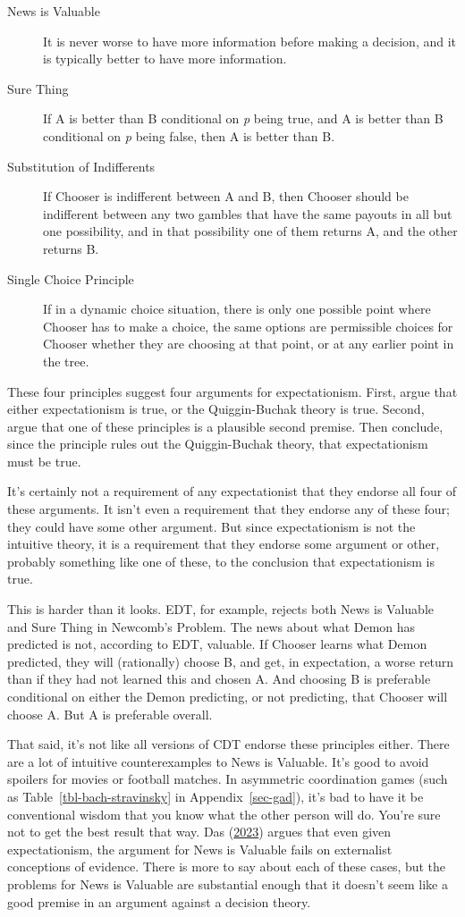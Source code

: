 \documentclass[
  12pt,
  letterpaper,
  DIV=11,
  numbers=noendperiod]{scrreprt}
\begin{document}
\begin{description}
\item[News is Valuable]
It is never worse to have more information before making a decision, and
it is typically better to have more information.
\item[Sure Thing]
If A is better than B conditional on \emph{p} being true, and A is
better than B conditional on \emph{p} being false, then A is better than
B.
\item[Substitution of Indifferents]
If Chooser is indifferent between A and B, then Chooser should be
indifferent between any two gambles that have the same payouts in all
but one possibility, and in that possibility one of them returns A, and
the other returns B.
\item[Single Choice Principle]
If in a dynamic choice situation, there is only one possible point where
Chooser has to make a choice, the same options are permissible choices
for Chooser whether they are choosing at that point, or at any earlier
point in the tree.
\end{description}

These four principles suggest four arguments for expectationism. First,
argue that either expectationism is true, or the Quiggin-Buchak theory
is true. Second, argue that one of these principles is a plausible
second premise. Then conclude, since the principle rules out the
Quiggin-Buchak theory, that expectationism must be true.

It's certainly not a requirement of any expectationist that they endorse
all four of these arguments. It isn't even a requirement that they
endorse any of these four; they could have some other argument. But
since expectationism is not the intuitive theory, it is a requirement
that they endorse some argument or other, probably something like one of
these, to the conclusion that expectationism is true.

This is harder than it looks. EDT, for example, rejects both News is
Valuable and Sure Thing in Newcomb's Problem. The news about what Demon
has predicted is not, according to EDT, valuable. If Chooser learns what
Demon predicted, they will (rationally) choose B, and get, in
expectation, a worse return than if they had not learned this and chosen
A. And choosing B is preferable conditional on either the Demon
predicting, or not predicting, that Chooser will choose A. But A is
preferable overall.

That said, it's not like all versions of CDT endorse these principles
either. There are a lot of intuitive counterexamples to News is
Valuable. It's good to avoid spoilers for movies or football matches. In
asymmetric coordination games (such as Table~\ref{tbl-bach-stravinsky}
in Appendix~\ref{sec-gad}), it's bad to have it be conventional wisdom
that you know what the other person will do. You're sure not to get the
best result that way. Das (\protect\hyperlink{ref-Das2023}{2023}) argues
that even given expectationism, the argument for News is Valuable fails
on externalist conceptions of evidence. There is more to say about each
of these cases, but the problems for News is Valuable are substantial
enough that it doesn't seem like a good premise in an argument against a
decision theory.
\end{document}

